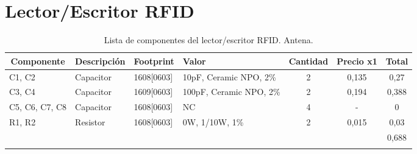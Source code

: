 \section{Lector/Escritor RFID}
\begin{longtable}{|l|p{2cm}|p{2cm}|p{2.5cm}|c|c|c|}
\hline
\multicolumn{1}{|c|}{\textbf{Componente}} & \multicolumn{1}{c|}{\textbf{Descripción}} & \textbf{ Footprint} & \textbf{Valor} & \textbf{Cantidad} & \textbf{Precio x1} & \textbf{Total} \\ \hline
C1, C2 & Capacitor & 1608[0603] & 10pF,   Ceramic NPO, 2\% & 2 & 0,135 & 0,27 \\ \hline
C3, C4 & Capacitor & 1609[0603] & 100pF, Ceramic NPO, 2\% & 2 & 0,194 & 0,388 \\ \hline
C5, C6, C7, C8 & Capacitor & 1608[0603] &  NC & 4 & - & 0 \\ \hline
R1,  R2 & Resistor & 1608[0603] & 0W,  1/10W,  1\% & 2 & 0,015 & 0,03 \\ \hline
 &  &  &  &  &  & 0,688 \\ \hline
\caption{Lista de componentes del lector/escritor RFID. Antena.}
\label{}
\end{longtable}

